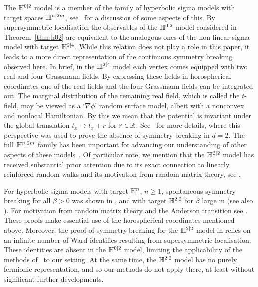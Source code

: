 \documentclass[11pt]{amsart}
\numberwithin{equation}{section}
\numberwithin{theorem}{section}
\newcommand{\1}{{\bf 1}}
\begin{document}
The $\mathbb{H}^{0|2}$ model is a member of the family of hyperbolic sigma
models with target spaces $\mathbb{H}^{n|2m}$, see~\cite{1912.05817} for a
discussion of some aspects of this.
By supersymmetric localisation the observables of the $\mathbb{H}^{0|2}$
model considered in Theorem~\ref{thm:h02} are equivalent to the
analogous ones of the non-linear sigma model with target
$\mathbb{H}^{2|4}$. While this relation does not play a role in this paper,
it leads to a more direct representation of the continuous symmetry
breaking observed here.  In brief, in the $\mathbb{H}^{2|4}$ model each
vertex comes equipped with two real and four Grassmann fields.  By
expressing these fields in horospherical coordinates one of the real
fields and the four Grassmann fields can be integrated out. The
marginal distribution of the remaining real field, which is called the
$t$-field, may be viewed as a `$\nabla\phi$' random surface model,
albeit with a nonconvex and nonlocal Hamiltonian.  By this we mean
that the potential is invariant under the global translation
$t_x\mapsto t_x +r$ for $r\in \mathbb{R}$.  See~\cite{MR4218682} for more
details, where this perspective was used to prove the absence of
symmetry breaking in $d=2$.  The full $\mathbb{H}^{n|2m}$ family has been
important for advancing our understanding of other aspects of these
models~\cite{MR4218682,1912.05817}. 
Of particular note, we mention that the $\mathbb{H}^{2|2}$ model has received
substantial prior attention due to its exact connection to linearly
reinforced random walks and its motivation from random matrix theory,
see \cite{MR3420510,MR863830,MR1134935,MR2104878,MR2728731}.

For hyperbolic sigma models with target $\mathbb{H}^n$, $n \geq 1$,
spontaneous symmetry breaking for all $\beta >0$ was shown in
\cite{MR2104878}, and with target $\mathbb{H}^{2|2}$ for $\beta$ large in
\cite{MR2728731} (see also \cite{MR3366053}).  For motivation from
random matrix theory and the Anderson transition see
\cite{MR2953867,MR3204347}.  These proofs make essential use of the
horospherical coordinates mentioned above.  Moreover, the proof of
symmetry breaking for the $\mathbb{H}^{2|2}$ model in \cite{MR2728731} relies
on an infinite number of Ward identifies resulting from supersymmetric
localisation.  These identities are absent in the $\mathbb{H}^{0|2}$ model,
limiting the applicability of the methods of~\cite{MR2728731} to our
setting. At the same time, the $\mathbb{H}^{2|2}$ model has no purely
fermionic representation, and so our methods do not apply there, at
least without significant further developments.
\end{document}
